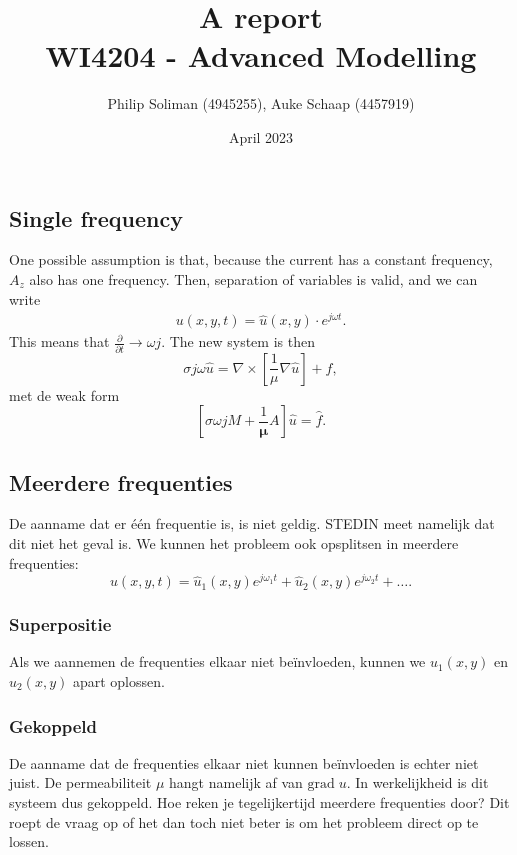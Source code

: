 \documentclass[11pt]{report}
\title{%
    A report \\
    \large WI4204 - Advanced Modelling
}
\author{Philip Soliman (4945255), Auke Schaap (4457919)}
\date{April 2023}
\begin{document}
\maketitle









\subsection{Single frequency}
One possible assumption is that, because the current has a constant frequency, $A_z$ also has one frequency. Then, separation of variables is valid, and we can write
\begin{align*}
    u(x,y,t) = \hat u(x,y) \cdot e^{j\omega t}.
\end{align*}
This means that $\frac{\partial}{\partial t} \to \omega j$. The new system is then
\begin{equation}
    \sigma j \omega \hat u = \nabla \times \left[\frac{1}{\mu}\nabla \hat u\right] + f,
\end{equation}
met de weak form
\begin{equation*}
    \left[\sigma \omega j M + \frac{1}{\mathbf \mu}A\right]\hat u = \hat f.
\end{equation*}

\subsection{Meerdere frequenties}
De aanname dat er één frequentie is, is niet geldig. STEDIN meet namelijk dat dit niet het geval is. We kunnen het probleem ook opsplitsen in meerdere frequenties:
\begin{equation}
    u(x,y,t) = \hat u_1(x,y) e^{j\omega_1 t} + \hat u_2(x,y) e^{j\omega_2 t} + \dots.
\end{equation}

\subsubsection{Superpositie}
Als we aannemen de frequenties elkaar niet beïnvloeden, kunnen we $\hat u_1(x,y)$ en $\hat u_2(x,y)$ apart oplossen.

\subsubsection{Gekoppeld}
De aanname dat de frequenties elkaar niet kunnen beïnvloeden is echter niet juist. De permeabiliteit $\mu$ hangt namelijk af van $\text{grad} \; u$. In werkelijkheid is dit systeem dus gekoppeld. Hoe reken je tegelijkertijd meerdere frequenties door? Dit roept de vraag op of het dan toch niet beter is om het probleem direct op te lossen.
\end{document}
